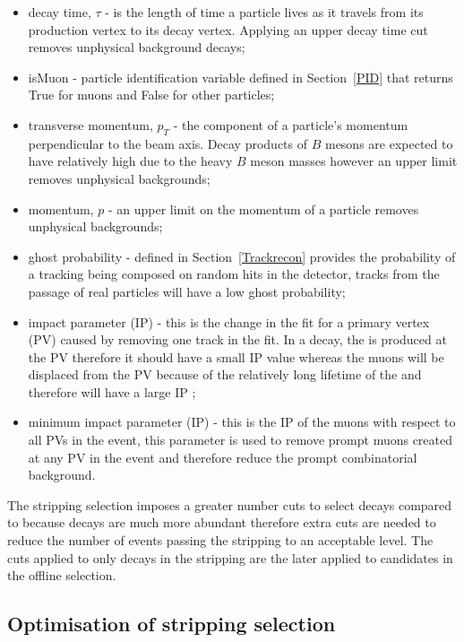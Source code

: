 \begin{itemize}
\item decay time, $\tau$ - is the length of time a particle lives as it travels from its production vertex to its decay vertex. Applying an upper decay time cut removes unphysical background decays;
\item isMuon - particle identification variable defined in Section~\ref{PID} that returns True for muons and False for other particles;
\item transverse momentum, $p_{T}$ - the component of a particle's momentum perpendicular to the beam axis. Decay products of $B$ mesons are expected to have relatively high \pt due to the heavy $B$ meson masses however an upper limit removes unphysical backgrounds;
\item momentum, $p$ - an upper limit on the momentum of a particle  removes unphysical backgrounds;
\item ghost probability - defined in Section~\ref{Trackrecon} provides the probability of a tracking being composed on random hits in the detector, tracks from the passage of real particles will have a low ghost probability; 
\item impact parameter (IP) \chisqd $ $- this is the change in the fit for a primary vertex (PV) caused by removing one track in the fit. In a \bsmumu decay, the \bsd is produced at the PV therefore it should have a small IP \chisqd value whereas the muons will be displaced from the PV because of the relatively long lifetime of the \bsd and therefore will have a large IP \chisqd;
\item minimum impact parameter (IP) \chisqd $ $- this is the IP \chisqd of the muons with respect to all PVs in the event, this parameter is used to remove prompt muons created at any PV in the event and therefore reduce the prompt combinatorial background. 
\end{itemize}

The stripping selection imposes a greater number cuts to select \bhh decays compared to \bsmumu because \bhh decays are much more abundant therefore extra cuts are needed to reduce the number of events passing the stripping to an acceptable level. The cuts applied to only \bhh decays in the stripping are the later applied to \bsmumu candidates in the offline selection. %


\subsection{Optimisation of \bsmumu stripping selection}
\label{strippingstudies}


